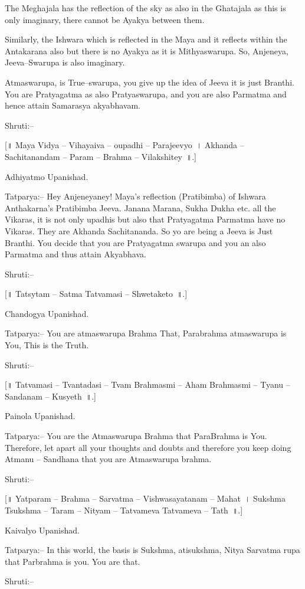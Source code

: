 The Meghajala has the reflection of the sky as also in the Ghatajala as this is only imaginary, there cannot be Ayakya between them.

Similarly, the Ishwara which is reflected in the Maya and it reflects within the Antakarana also but there is no Ayakya as it is Mithyaswarupa. So, Anjeneya, Jeeva–Swarupa is also imaginary.

Atmaswarupa, is True–swarupa, you give up the idea of Jeeva it is just Branthi. You are Pratyagatma as also Pratyaswarupa, and you are also Parmatma and hence attain Samarasya akyabhavam.

Shruti:–

[॥ Maya Vidya – Vihayaiva – oupadhi – Parajeevyo~। Akhanda – Sachitanandam – Param – Brahma – Vilakshitey~॥.]

Adhiyatmo Upanishad.

Tatparya:– Hey Anjeneyaney! Maya's reflection (Pratibimba) of Ishwara Anthakarna's Pratibimba Jeeva. Janana Marana, Sukha Dukha etc. all the Vikaras, it is not only upadhis but also that Pratyagatma Parmatma have no Vikaras. They are Akhanda Sachitananda. So yo are being a Jeeva is Just Branthi. You decide that you are Pratyagatma swarupa and you an also Parmatma and thus attain Akyabhava.

Shruti:–

[॥ Tatsytam – Satma Tatvamasi – Shwetaketo~॥.]

Chandogya Upanishad.

Tatparya:– You are atmaswarupa Brahma That, Parabrahma atmaswarupa is You, This is the Truth.

Shruti:–

[॥ Tatvamasi – Tvantadasi – Tvam Brahmasmi – Aham Brahmasmi – Tyanu – Sandanam – Kusyeth~॥.]

Painola Upanishad.

Tatparya:– You are the Atmaswarupa Brahma that ParaBrahma is You. Therefore, let apart all your thoughts and doubts and therefore you keep doing Atmanu – Sandhana that you are Atmaswarupa brahma.

Shruti:–

[॥ Yatparam – Brahma – Sarvatma – Vishwasayatanam – Mahat~। Sukshma Tsukshma – Taram – Nityam – Tatvameva Tatvameva – Tath~॥.]

Kaivalyo Upanishad.

Tatparya:– In this world, the basis is Sukshma, atisukshma, Nitya Sarvatma rupa that Parbrahma is you. You are that.

Shruti:–

